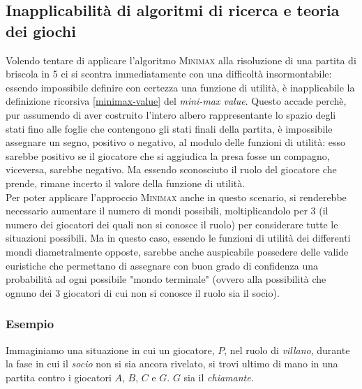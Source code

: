 \subsection{Inapplicabilità di algoritmi di ricerca e teoria dei giochi}
Volendo tentare di applicare l'algoritmo \textsc{Minimax} alla risoluzione di una partita di briscola in 5 ci si scontra immediatamente con una difficoltà insormontabile: essendo impossibile definire con certezza una funzione di utilità, è inapplicabile la definizione ricorsiva \ref{minimax-value} del \emph{mini-max value}.
Questo accade perchè, pur assumendo di aver costruito l'intero albero rappresentante lo spazio degli stati fino alle foglie che contengono gli stati finali della partita, è impossibile assegnare un segno, positivo o negativo, al modulo delle funzioni di utilità: esso sarebbe positivo se il giocatore che si aggiudica la presa fosse un compagno, viceversa, sarebbe negativo.
Ma essendo sconosciuto il ruolo del giocatore che prende, rimane incerto il valore della funzione di utilità.\\
Per poter applicare l'approccio \textsc{Minimax} anche in questo scenario, si renderebbe necessario aumentare il numero di mondi possibili, moltiplicandolo per 3 (il numero dei giocatori dei quali non si conosce il ruolo) per considerare tutte le situazioni possibili.
Ma in questo caso, essendo le funzioni di utilità dei differenti mondi diametralmente opposte, sarebbe anche auspicabile possedere delle valide euristiche che permettano di assegnare con buon grado di confidenza una probabilità ad ogni possibile "mondo terminale" (ovvero alla possibilità che ognuno dei 3 giocatori di cui non si conosce il ruolo sia il socio).

\subsubsection*{Esempio}
Immaginiamo una situazione in cui un giocatore, $P$, nel ruolo di \emph{villano}, durante la fase in cui il \emph{socio} non si sia ancora rivelato, si trovi ultimo di mano in una partita contro i giocatori $A$, $B$, $C$ e $G$. $G$ sia il \emph{chiamante}.\\


